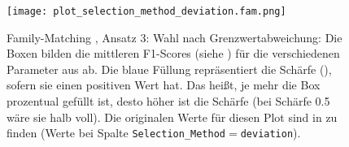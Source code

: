         \begin{figure}[H]
            \centering
            \texttt{[image: plot\_selection\_method\_deviation.fam.png]}
            \caption[Family-Matching , Ansatz 3: Wahl nach Grenzwertabweichung]{Family-Matching , Ansatz 3: Wahl nach Grenzwertabweichung: Die Boxen bilden die mittleren F1-Scores (siehe ) für die verschiedenen Parameter aus  ab. Die blaue Füllung repräsentiert die Schärfe (), sofern sie einen positiven Wert hat. Das heißt, je mehr die Box prozentual gefüllt ist, desto höher ist die Schärfe (bei Schärfe 0.5 wäre sie halb voll). Die originalen Werte für diesen Plot sind in  zu finden (Werte bei Spalte \texttt{Selection\_Method}$=$\texttt{deviation}).}
            \label{fig:selection_method.deviation.fam}
        \end{figure}

